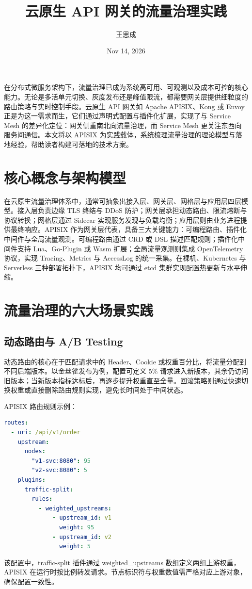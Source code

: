 \title{云原生 API 网关的流量治理实践}
\author{王思成}
\date{Nov 14, 2026}
\maketitle
在分布式微服务架构下，流量治理已成为系统高可用、可观测以及成本可控的核心能力。无论是多活单元切换、灰度发布还是峰值限流，都需要网关层提供细粒度的路由策略与实时控制手段。云原生 API 网关如 Apache APISIX、Kong 或 Envoy 正是为这一需求而生，它们通过声明式配置与插件化扩展，实现了与 Service Mesh 的差异化定位：网关侧重南北向流量治理，而 Service Mesh 更关注东西向服务间通信。本文将以 APISIX 为实践载体，系统梳理流量治理的理论模型与落地经验，帮助读者构建可落地的技术方案。\par
\chapter{核心概念与架构模型}
在云原生流量治理体系中，通常可抽象出接入层、网关层、网格层与应用层四层模型。接入层负责边缘 TLS 终结与 DDoS 防护；网关层承担动态路由、限流熔断与协议转换；网格层通过 Sidecar 实现服务发现与负载均衡；应用层则由业务进程提供最终响应。APISIX 作为网关层代表，具备三大关键能力：可编程路由、插件化中间件与全局流量观测。可编程路由通过 CRD 或 DSL 描述匹配规则；插件化中间件支持 Lua、Go-Plugin 或 Wasm 扩展；全局流量观测则集成 OpenTelemetry 协议，实现 Tracing、Metrics 与 AccessLog 的统一采集。在裸机、Kubernetes 与 Serverless 三种部署拓扑下，APISIX 均可通过 etcd 集群实现配置热更新与水平伸缩。\par
\chapter{流量治理的六大场景实践}
\section{动态路由与 A/B Testing}
动态路由的核心在于匹配请求中的 Header、Cookie 或权重百分比，将流量分配到不同后端版本。以金丝雀发布为例，配置可定义 5\%{} 请求进入新版本，其余仍访问旧版本；当新版本指标达标后，再逐步提升权重直至全量。回滚策略则通过快速切换权重或直接删除路由规则实现，避免长时间处于中间状态。\par
APISIX 路由规则示例：\par
\begin{lstlisting}[language=yaml]
routes:
  - uri: /api/v1/order
    upstream:
      nodes:
        "v1-svc:8080": 95
        "v2-svc:8080": 5
    plugins:
      traffic-split:
        rules:
          - weighted_upstreams:
              - upstream_id: v1
                weight: 95
              - upstream_id: v2
                weight: 5
\end{lstlisting}
该配置中，traffic-split 插件通过 weighted\_{}upstreams 数组定义两组上游权重，APISIX 在运行时按比例转发请求。节点标识符与权重数值需严格对应上游对象，确保配置一致性。\par
